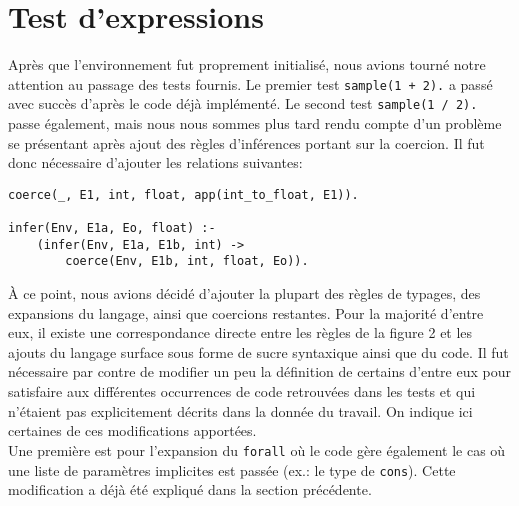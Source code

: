\documentclass[12pt, titlepage]{article}
\begin{document}
\section{Test d'expressions}
Après que l'environnement fut proprement initialisé, nous avions tourné notre
attention au passage des tests fournis. Le premier test \texttt{sample(1 + 2).}
a passé avec succès d'après le code déjà implémenté. Le second test
\texttt{sample(1 / 2).} passe également, mais nous nous sommes plus tard rendu
compte d'un problème se présentant après ajout des règles d'inférences portant
sur la coercion. Il fut donc nécessaire d'ajouter les relations suivantes:
\begin{lstlisting}
coerce(_, E1, int, float, app(int_to_float, E1)).

infer(Env, E1a, Eo, float) :-
    (infer(Env, E1a, E1b, int) ->
        coerce(Env, E1b, int, float, Eo)).
\end{lstlisting}

À ce point, nous avions décidé d'ajouter la plupart des règles de typages, des
expansions du langage, ainsi que coercions restantes. Pour la majorité d'entre
eux, il existe une correspondance directe entre les règles de la figure 2 et
les ajouts du langage surface sous forme de sucre syntaxique ainsi que du code.
Il fut nécessaire par contre de modifier un peu la définition de certains
d'entre eux pour satisfaire aux différentes occurrences de code retrouvées dans
les tests et qui n'étaient pas explicitement décrits dans la donnée du travail.
On indique ici certaines de ces modifications apportées. \\

Une première est pour l'expansion du \texttt{forall} où le code gère également
le cas où une liste de paramètres implicites est passée (ex.: le type de
\texttt{cons}). Cette modification a déjà été expliqué dans la section
précédente. \\
\end{document}
